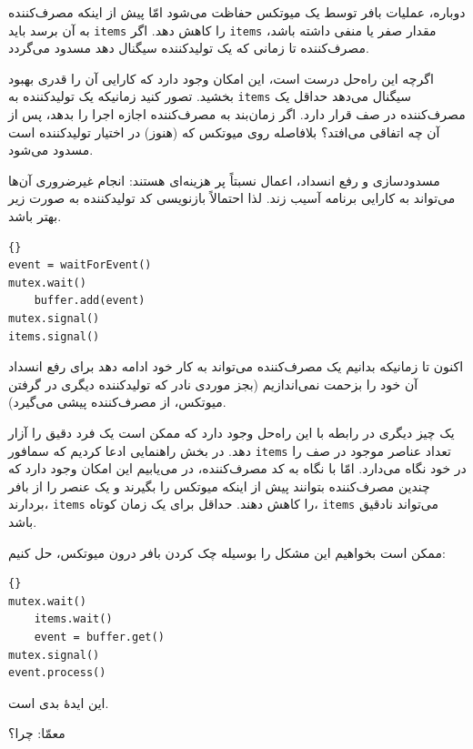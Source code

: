 \documentclass{book}
\newcommand{\clearemptydoublepage}{\newpage\cleardoublepage}
\begin{document}
    دوباره، عملیات بافر توسط یک میوتکس حفاظت می‌شود امّا پیش از اینکه مصرف‌کننده به آن برسد باید {\tt items} را کاهش دهد. 
    اگر {\tt items} مقدار صفر یا منفی داشته باشد، مصرف‌کننده تا زمانی که یک تولیدکننده سیگنال دهد مسدود می‌گردد. 

    اگرچه این راه‌حل درست است، این امکان وجود دارد که کارایی آن را قدری بهبود بخشید. 
    تصور کنید زمانیکه یک تولیدکننده به {\tt items} سیگنال می‌دهد حداقل یک مصرف‌کننده در صف قرار دارد. 
    اگر زمان‌بند به مصرف‌کننده اجازه اجرا را بدهد، پس از آن چه اتفاقی می‌افتد؟
    بلافاصله روی میوتکس که (هنوز) در اختیار تولیدکننده است مسدود می‌شود. 

    مسدودسازی و رفع انسداد، اعمال نسبتاً پر هزینه‌ای هستند: 
    انجام غیرضروری آن‌ها می‌تواند به کارایی برنامه آسیب زند. لذا احتمالاً بازنویسی کد تولیدکننده به صورت زیر بهتر باشد. 
\begin{latin}
\begin{lstlisting}[title=\rl{راه‌حل بهبود یافتهٔ تولیدکننده}]{}
event = waitForEvent()
mutex.wait()
    buffer.add(event)
mutex.signal()
items.signal()
\end{lstlisting}
\end{latin}

    اکنون تا زمانیکه بدانیم یک مصرف‌کننده می‌تواند به کار خود ادامه دهد برای رفع انسداد آن خود را بزحمت نمی‌اندازیم 
    (بجز موردی نادر که تولید‌کننده‌ دیگری در گرفتن میوتکس، از مصرف‌کننده پیشی می‌گیرد).
    
    یک چیز دیگری در رابطه با این راه‌حل وجود دارد که ممکن است یک فرد دقیق را آزار دهد. 
    در بخش راهنمایی ادعا کردیم که سمافور {\tt items} تعداد عناصر موجود در صف را در خود نگاه می‌دارد. امّا با نگاه به کد مصرف‌کننده، 
    در می‌یابیم این امکان وجود دارد که چندین مصرف‌کننده بتوانند پیش از اینکه میوتکس را بگیرند و یک عنصر را از بافر بردارند، {\tt items} را  کاهش دهند. 
    حداقل برای یک زمان کوتاه، {\tt items}  می‌تواند نادقیق باشد. 

    ممکن است بخواهیم این مشکل را بوسیله چک کردن بافر درون میوتکس، حل کنیم: 

\begin{latin}
\begin{lstlisting}[title=\rl{راه‌حل معیوب مصرف‌کننده}]{}
mutex.wait()
    items.wait()
    event = buffer.get()
mutex.signal()
event.process()
\end{lstlisting}
\end{latin}

    این ایدهٔ بدی است. 

    معمّا: چرا؟


\clearemptydoublepage
\end{document}
